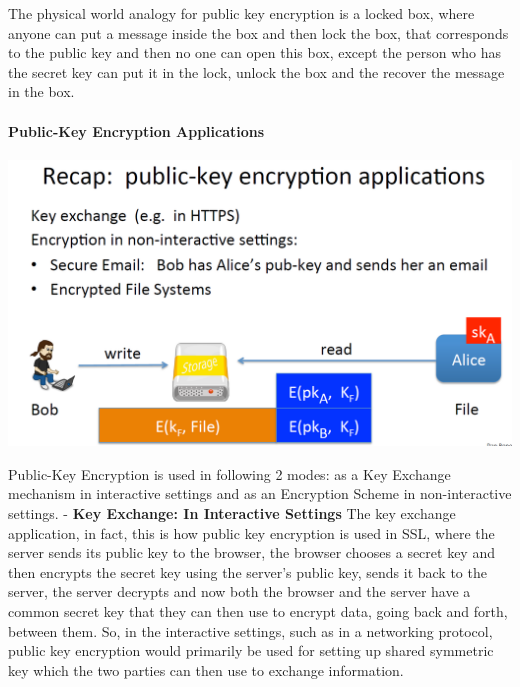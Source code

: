 \documentclass[11pt]{article}
\makeatletter
\def\maxwidth{\ifdim\Gin@nat@width>\linewidth\linewidth
    \else\Gin@nat@width\fi}
\let\Oldincludegraphics\includegraphics
\renewcommand{\includegraphics}[1]{\Oldincludegraphics[width=.8\maxwidth]{#1}}
\makeatother
\begin{document}
The physical world analogy for public key encryption is a locked box,
where anyone can put a message inside the box and then lock the box,
that corresponds to the public key and then no one can open this box,
except the person who has the secret key can put it in the lock, unlock
the box and the recover the message in the box.

\hypertarget{public-key-encryption-applications}{%
\paragraph{Public-Key Encryption
Applications}\label{public-key-encryption-applications}}

\includegraphics{./Images/PKEncApp1-Recap.png}

Public-Key Encryption is used in following 2 modes: as a Key Exchange
mechanism in interactive settings and as an Encryption Scheme in
non-interactive settings. - \textbf{Key Exchange: In Interactive
Settings} The key exchange application, in fact, this is how public key
encryption is used in SSL, where the server sends its public key to the
browser, the browser chooses a secret key and then encrypts the secret
key using the server's public key, sends it back to the server, the
server decrypts and now both the browser and the server have a common
secret key that they can then use to encrypt data, going back and forth,
between them. So, in the interactive settings, such as in a networking
protocol, public key encryption would primarily be used for setting up
shared symmetric key which the two parties can then use to exchange
information.
\end{document}
